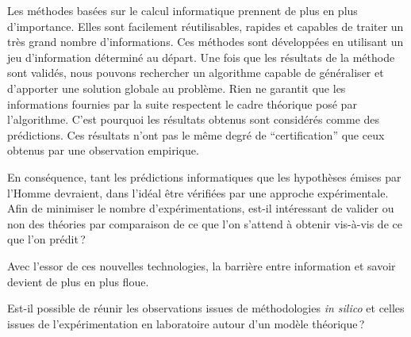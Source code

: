 \begin{refsegment}

Les méthodes basées sur le calcul informatique prennent de plus en plus d'importance. Elles sont facilement réutilisables, rapides et capables de traiter un très grand nombre d'informations. Ces méthodes sont développées en utilisant un jeu d'information déterminé au départ. Une fois que les résultats de la méthode sont validés, nous pouvons rechercher un algorithme capable de généraliser et d'apporter une solution globale au problème. Rien ne garantit que les informations fournies par la suite respectent le cadre théorique posé par l'algorithme. C'est pourquoi les résultats obtenus sont considérés comme des prédictions. Ces résultats n'ont pas le même degré de “certification” que ceux obtenus par une observation empirique.

En conséquence, tant les prédictions informatiques que les hypothèses émises par l'Homme devraient, dans l'idéal être vérifiées par une approche expérimentale. Afin de minimiser le nombre d'expérimentations, est-il intéressant de valider ou non des théories par comparaison de ce que l'on s'attend à obtenir vis-à-vis de ce que l'on prédit ?

Avec l'essor de ces nouvelles technologies, la barrière entre information et savoir devient de plus en plus floue.



Est-il possible de réunir les observations issues de méthodologies \textit{in silico} et celles issues de l'expérimentation en laboratoire autour d'un modèle théorique ?


\end{refsegment}
